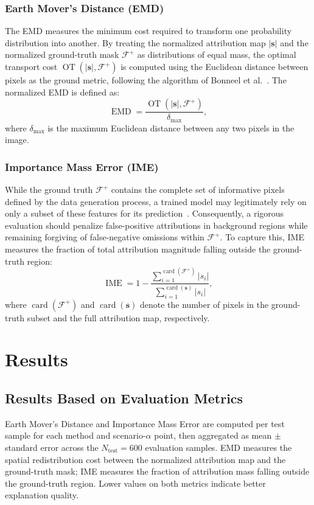 \documentclass[pdflatex,sn-mathphys-num]{sn-jnl}
\theoremstyle{thmstyleone}
\theoremstyle{thmstyletwo}%
\theoremstyle{thmstylethree}%
\begin{document}
\subsubsection{Earth Mover's Distance (EMD)}
The EMD measures the minimum cost required to transform one probability distribution into another. By treating the normalized attribution map $|\mathbf{s}|$ and the normalized ground-truth mask $\mathcal{F}^+$ as distributions of equal mass, the optimal transport cost $\operatorname{OT}(|\mathbf{s}|, \mathcal{F}^+)$ is computed using the Euclidean distance between pixels as the ground metric, following the algorithm of Bonneel et al.~\cite{bonneel2011}. The normalized EMD is defined as:
\begin{equation}
    \operatorname{EMD} = \frac{\operatorname{OT}(|\mathbf{s}|, \mathcal{F}^+)}{\delta_{\max}},
\end{equation}
where $\delta_{\max}$ is the maximum Euclidean distance between any two pixels in the image.

\subsubsection{Importance Mass Error (IME)}
While the ground truth $\mathcal{F}^+$ contains the complete set of informative pixels defined by the data generation process, a trained model may legitimately rely on only a subset of these features for its prediction~\cite{clark2024, arras2022}. Consequently, a rigorous evaluation should penalize false-positive attributions in background regions while remaining forgiving of false-negative omissions within $\mathcal{F}^+$. To capture this, IME measures the fraction of total attribution magnitude falling outside the ground-truth region:
\begin{equation}
    \operatorname{IME} = 1 - \frac{\sum_{i=1}^{\operatorname{card}(\mathcal{F}^+)} |s_i|}{\sum_{i=1}^{\operatorname{card}(\mathbf{s})} |s_i|},
\end{equation}
where $\operatorname{card}(\mathcal{F}^+)$ and $\operatorname{card}(\mathbf{s})$ denote the number of pixels in the ground-truth subset and the full attribution map, respectively.

\section{Results}\label{sec:results}

\subsection{Results Based on Evaluation Metrics}
Earth Mover's Distance and Importance Mass Error are computed per test sample for each method and scenario-$\alpha$ point, then aggregated as mean $\pm$ standard error across the $N_{\text{test}}=600$ evaluation samples. EMD measures the spatial redistribution cost between the normalized attribution map and the ground-truth mask; IME measures the fraction of attribution mass falling outside the ground-truth region. Lower values on both metrics indicate better explanation quality.
\end{document}
